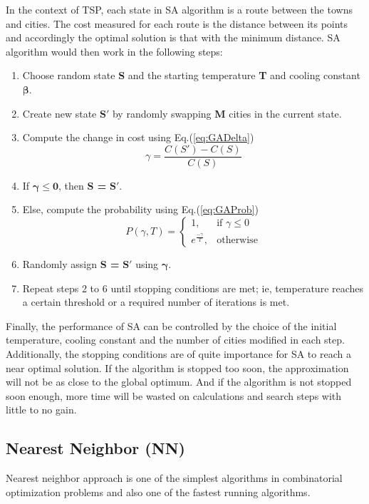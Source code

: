 \documentclass[twocolumn]{article}
\begin{document}
	In the context of TSP, each state in SA algorithm is a route between the towns and cities. The cost measured for each route is the distance  between its points and accordingly the optimal solution is that with the minimum distance. SA algorithm would then work in the following steps:
	\begin{enumerate}
		\item Choose random state {\bfseries S} and the starting temperature {\bfseries T} and cooling constant {$\boldsymbol \beta$}.
		\item Create new state $\boldsymbol{S\prime}$ by randomly swapping {\bfseries M} cities in the current state.
		\item Compute the change in cost using Eq.(\ref{eq:GADelta})
		\begin{equation} \label{eq:GADelta}
		\gamma = \dfrac{C(S')-C(S)}{C(S)}
		\end{equation}
		\item If {$\boldsymbol{\gamma \leqslant 0}$, then {\bfseries S =} $\boldsymbol{S\prime}$.}
		\item Else, compute the probability using Eq.(\ref{eq:GAProb})
		\begin{equation} \label{eq:GAProb}
		P(\gamma, T)=
		\begin{cases}
		1,& \text{if } \gamma\leqslant 0\\
		e^{\frac{-\gamma}{T}},& \text{otherwise}
		\end{cases} 
		\end{equation}
		\item Randomly assign {\bfseries S =} $\boldsymbol{S\prime}$ using {$\boldsymbol \gamma$}.
		\item Repeat steps 2 to 6 until stopping conditions are met; ie, temperature reaches a certain threshold or a required number of iterations is met.
	\end{enumerate}
	Finally, the performance of SA can be controlled by the choice of the initial temperature, cooling constant and the number of cities modified in each step. Additionally, the stopping conditions are of quite importance for SA to reach a near optimal solution. If the algorithm is stopped too soon, the approximation will not be as close to the global optimum. And if the algorithm is not stopped soon enough, more time will be wasted on calculations and search steps with little to no gain.

	\subsection{Nearest Neighbor (NN)}
	Nearest neighbor approach is one of the simplest algorithms in combinatorial optimization problems and also one of the fastest running algorithms.
	
\end{document}
